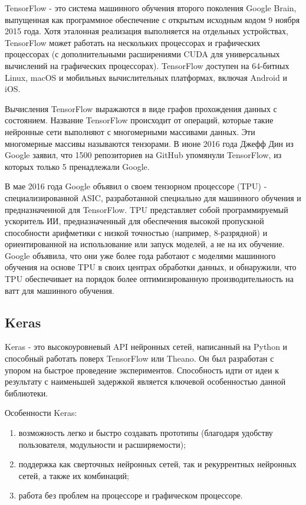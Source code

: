 TensorFlow - это система машинного обучения второго поколения Google Brain, выпущенная как программное обеспечение с открытым исходным кодом 9 ноября 2015 года. Хотя эталонная реализация выполняется на отдельных устройствах, TensorFlow может работать на нескольких процессорах и графических процессорах (с дополнительными расширениями CUDA для универсальных вычислений на графических процессорах). TensorFlow доступен на 64-битных Linux, macOS и мобильных вычислительных платформах, включая Android и iOS.

Вычисления TensorFlow выражаются в виде графов прохождения данных с состоянием. Название TensorFlow происходит от операций, которые такие нейронные сети выполняют с многомерными массивами данных. Эти многомерные массивы называются тензорами. В июне 2016 года Джефф Дин из Google заявил, что 1500 репозиториев на GitHub упомянули TensorFlow, из которых только 5 пренадлежали Google.

В мае 2016 года Google объявил о своем тензорном процессоре (TPU) - специализированной ASIC, разработанной специально для машинного обучения и предназначенной для TensorFlow. TPU представляет собой программируемый ускоритель ИИ, предназначенный для обеспечения высокой пропускной способности арифметики с низкой точностью (например, 8-разрядной) и ориентированной на использование или запуск моделей, а не на их обучение. Google объявила, что они уже более года работают с моделями машинного обучения на основе TPU в своих центрах обработки данных, и обнаружили, что TPU обеспечивает на порядок более оптимизированную производительность на ватт для машинного обучения.

\subsection{Keras}
\label{sec:development:keras}

Keras - это высокоуровневый API нейронных сетей, написанный на Python и способный работать поверх TensorFlow или Theano. Он был разработан с упором на быстрое проведение экспериментов. Способность идти от идеи к результату с наименьшей задержкой является ключевой особенностью данной библиотеки.

Особенности Keras:
\begin{enumerate}
  \item возможность легко и быстро создавать прототипы (благодаря удобству пользователя, модульности и расширяемости);
  \item поддержка как сверточных нейронных сетей, так и рекуррентных нейронных сетей, а также их комбинаций;
  \item работа без проблем на процессоре и графическом процессоре.
\end{enumerate}

